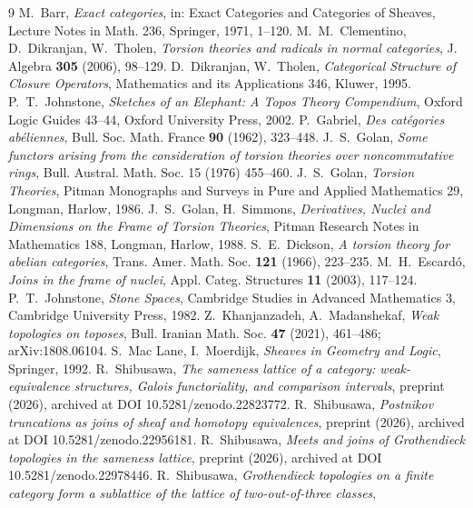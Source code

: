 \documentclass[11pt]{amsart}
\theoremstyle{definition}
\begin{document}
\begin{thebibliography}{9}
 M.~Barr, \emph{Exact categories}, in: Exact Categories and
Categories of Sheaves, Lecture Notes in Math. 236, Springer, 1971, 1--120.
 M.~M.~Clementino, D.~Dikranjan, W.~Tholen, \emph{Torsion
theories and radicals in normal categories}, J. Algebra \textbf{305} (2006),
98--129.
 D.~Dikranjan, W.~Tholen, \emph{Categorical Structure of Closure
Operators}, Mathematics and its Applications 346, Kluwer, 1995.
 P.~T.~Johnstone, \emph{Sketches of an Elephant: A Topos
Theory Compendium}, Oxford Logic Guides 43--44, Oxford University Press, 2002.
 P.~Gabriel, \emph{Des cat\'egories ab\'eliennes}, Bull.
Soc. Math. France \textbf{90} (1962), 323--448.
 J.~S.~Golan, \emph{Some functors arising from the
consideration of torsion theories over noncommutative rings}, Bull.
Austral. Math. Soc. 15 (1976) 455--460.
 J.~S.~Golan, \emph{Torsion Theories}, Pitman Monographs
and Surveys in Pure and Applied Mathematics 29, Longman, Harlow, 1986.
 J.~S.~Golan, H.~Simmons, \emph{Derivatives, Nuclei
and Dimensions on the Frame of Torsion Theories}, Pitman Research Notes in
Mathematics 188, Longman, Harlow, 1988.
 S.~E.~Dickson, \emph{A torsion theory for abelian
categories}, Trans. Amer. Math. Soc. \textbf{121} (1966), 223--235.
 M.~H.~Escard\'o, \emph{Joins in the frame of nuclei}, Appl.
Categ. Structures \textbf{11} (2003), 117--124.
 P.~T.~Johnstone, \emph{Stone Spaces}, Cambridge
Studies in Advanced Mathematics 3, Cambridge University Press, 1982.
 Z.~Khanjanzadeh, A.~Madanshekaf, \emph{Weak topologies on
toposes}, Bull. Iranian Math. Soc. \textbf{47} (2021), 461--486;
arXiv:1808.06104.
 S.~Mac Lane, I.~Moerdijk, \emph{Sheaves in Geometry and Logic},
Springer, 1992.
 R.~Shibusawa, \emph{The sameness lattice of a category:
weak-equivalence structures, Galois functoriality, and comparison intervals},
preprint (2026), archived at DOI 10.5281/zenodo.22823772.
 R.~Shibusawa, \emph{Postnikov truncations as joins of sheaf
and homotopy equivalences}, preprint (2026), archived at DOI 10.5281/zenodo.22956181.
 R.~Shibusawa, \emph{Meets and joins of Grothendieck
topologies in the sameness lattice}, preprint (2026), archived at DOI
10.5281/zenodo.22978446.
 R.~Shibusawa, \emph{Grothendieck topologies on a finite
category form a sublattice of the lattice of two-out-of-three classes},

\end{thebibliography}
\end{document}
